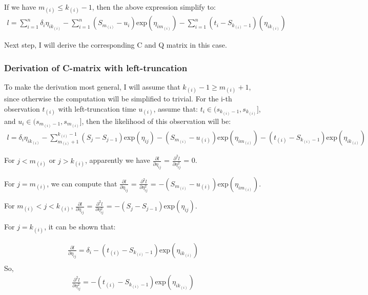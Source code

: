 \documentclass[]{article}
\begin{document}
If we have \(m_{(i)} \leq k_{(i)}-1\), then the above expression
simplify to:
\begin{equation}\begin{aligned}\label{eqn:all_together_logoftr2}
l = \sum_{i=1}^{n} {\delta_i}{\eta_{i{k_{(i)}}}}- \sum_{i=1}^{n} (S_{m_{(i)}}-u_i)\text{exp}(\eta_{im_{(i)}}) - \sum_{i=1}^{n} (t_i-S_{k_{(i)}-1})(\eta_{ik_{(i)}})
\end{aligned}\end{equation}

Next step, I will derive the corresponding C and Q matrix in this case.

\hypertarget{derivation-of-c-matrix-with-left-truncation}{%
\subsubsection{Derivation of C-matrix with
left-truncation}\label{derivation-of-c-matrix-with-left-truncation}}

To make the derivation most general, I will assume that
\(k_{(i)}-1 \geq m_{(i)}+1\), since otherwise the computation will be
simplified to trivial. For the i-th observation \(t_{(i)}\) with
left-truncation time \(u_{(i)}\), assume that:
\(t_i \in (s_{k_{(i)}-1},s_{k_{(i)}}]\), and
\(u_i \in (s_{m_{(i)}-1},s_{m_{(i)}}]\), then the likelihood of this
observation will be:
\begin{equation}\begin{aligned}\label{eqn:ind_i_log}
l = \delta_i \eta_{ik_{(i)}} - \sum_{m_{(i)}+1}^{k_{(i)}-1} (S_j - S_{j-1}) \text{exp}(\eta_{ij}) - (S_{m_{(i)}}-u_{(i)})\text{exp}(\eta_{im_{(i)}})-(t_{(i)}-S_{k_{(i)}-1})\text{exp}(\eta_{ik_{(i)}})
\end{aligned}\end{equation}

For \(j<m_{(i)}\) or \(j>k_{(i)}\), apparently we have
\(\frac{ \partial l}{\partial \eta_{ij}}\) =
\(\frac{ \partial^2 l}{\partial \eta_{ij}^2}\) = 0.

For \(j = m_{(i)}\), we can compute that
\(\frac{ \partial l}{\partial \eta_{ij}}\) =
\(\frac{ \partial^2 l}{\partial \eta_{ij}^2}\) =
\(- (S_{m_{(i)}}-u_{(i)})\text{exp}(\eta_{im_{(i)}})\).

For \(m_{(i)} < j < k_{(i)}\),
\(\frac{ \partial l}{\partial \eta_{ij}}\) =
\(\frac{ \partial^2 l}{\partial \eta_{ij}^2}\) =
\(- (S_j-S_{j-1})\text{exp}(\eta_{ij})\).

For \(j = k_{(i)}\), it can be shown that:

\begin{equation}\begin{aligned}\label{eqn:smalladd}
\frac{ \partial l}{\partial \eta_{ij}} = \delta_i - (t_{(i)}-S_{k_{(i)}-1})\text{exp}(\eta_{ik_{(i)}}) \\
\end{aligned}\end{equation} So,
\begin{equation}\begin{aligned}\label{eqn:smalladd2}
\frac{ \partial^2 l}{\partial \eta_{ij}^2} = - (t_{(i)}-S_{k_{(i)}-1})\text{exp}(\eta_{ik_{(i)}})
\end{aligned}\end{equation}
\end{document}
